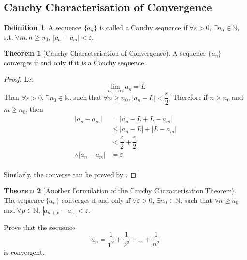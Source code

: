 \documentclass[fleqn, a4paper, 12pt, twoside]{article}
\theoremstyle{definition}
\newtheorem{definition}{Definition}
\theoremstyle{theorem}
\newtheorem{theorem}{Theorem}
\begin{document}
{\subsection{Cauchy Characterisation of Convergence}

\begin{definition}
	A sequence $\{a_n\}$ is called a Cauchy sequence if $\forall \varepsilon > 0$, $\exists n_0 \in \mathbb{N}$, s.t. $\forall m, n \geq n_0$, $|a_n - a_m| < \varepsilon$.
\end{definition}

\begin{theorem}[Cauchy Characterisation of Convergence]
	A sequence $\{a_n\}$ converges if and only if it is a Cauchy sequence.
	\label{Cauchy Characterisation of Convergence}
\end{theorem}

\begin{proof}
	Let
	\begin{equation*}
		\lim\limits_{n \to \infty} a_n = L
	\end{equation*}
	Then $\forall \varepsilon > 0$, $\exists n_0 \in \mathbb{N}$, such that $\forall n \geq n_0$, $|a_n - L| < \dfrac{\varepsilon}{2}$.
	Therefore if $n \ge n_0$ and $m \ge n_0$, then
	\begin{align*}
		|a_n - a_m| &= |a_n - L + L - a_m|\\
		&\le |a_n - L| + |L - a_m|\\
		&< \dfrac{\varepsilon}{2} + \dfrac{\varepsilon}{2}\\
		\therefore |a_n - a_m| &= \varepsilon
	\end{align*}
	~\\
	Similarly, the converse can be proved by .
\end{proof}

\begin{theorem}[Another Formulation of the Cauchy Characterisation Theorem]
	The sequence $\{a_n\}$ converges if and only if $\forall \varepsilon > 0$, $\exists n_0 \in \mathbb{N}$, such that $\forall n \geq n_0$ and $\forall p \in \mathbb{N}$, $|a_{n + p} - a_n| < \varepsilon$.
	\label{Another formulation of the Cauchy characterisation theorem}
\end{theorem}

\begin{question}
	Prove that the sequence
	\begin{equation*}
		a_n = \dfrac{1}{1^2} + \dfrac{1}{2^2} + \dots + \dfrac{1}{n^2}
	\end{equation*}
	is convergent.
\end{question}

}
\end{document}
